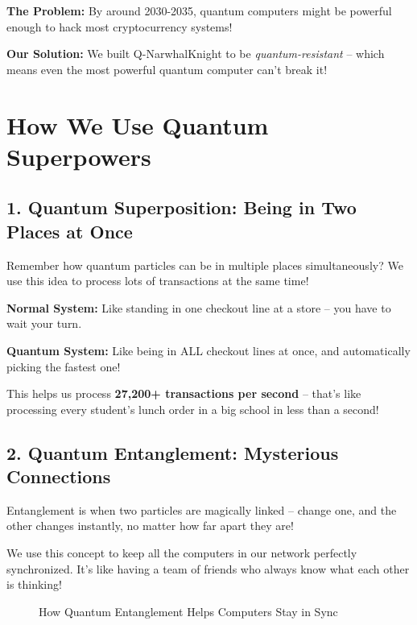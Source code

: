 \documentclass[11pt,a4paper]{article}
\begin{document}
\textbf{The Problem:} By around 2030-2035, quantum computers might be powerful enough to hack most cryptocurrency systems!

\textbf{Our Solution:} We built Q-NarwhalKnight to be \textit{quantum-resistant} -- which means even the most powerful quantum computer can't break it!

\section{How We Use Quantum Superpowers}

\subsection{1. Quantum Superposition: Being in Two Places at Once}

Remember how quantum particles can be in multiple places simultaneously? We use this idea to process lots of transactions at the same time!

\begin{tcolorbox}[colback=funpurple!10,colframe=funpurple,title=\textbf{Real-World Example}]
\textbf{Normal System:} Like standing in one checkout line at a store -- you have to wait your turn.

\textbf{Quantum System:} Like being in ALL checkout lines at once, and automatically picking the fastest one!

This helps us process \textbf{27,200+ transactions per second} -- that's like processing every student's lunch order in a big school in less than a second!
\end{tcolorbox}

\subsection{2. Quantum Entanglement: Mysterious Connections}

Entanglement is when two particles are magically linked -- change one, and the other changes instantly, no matter how far apart they are!

We use this concept to keep all the computers in our network perfectly synchronized. It's like having a team of friends who always know what each other is thinking!

\begin{figure}[H]
\centering
{}
\caption{How Quantum Entanglement Helps Computers Stay in Sync}
\end{figure}
\end{document}

